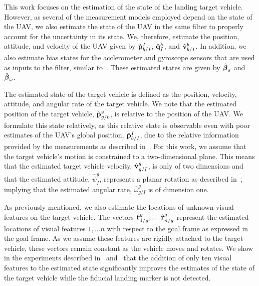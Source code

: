 
This work focuses on the estimation of the state of the landing target vehicle.
However, as several of the measurement models employed depend on the state of the
UAV, we also estimate the state of the UAV in the same filter to properly
account for the uncertainty in its state.
We, therefore, estimate the position, attitude, and velocity of the UAV given by
$\hat{\boldsymbol{\mathrm{p}}}_{b/I}^{I}$, $\hat{\boldsymbol{\mathrm{q}}}_I^{b}$, and
$\hat{\boldsymbol{\mathrm{v}}}_{b/I}^b$.
In addition, we also estimate bias states for the acclerometer and gyroscope sensors that are
used as inputs to the filter, similar to~\cite{li2018common}. These estimated states are given by
$\hat{\boldsymbol{\mathrm{\beta}}}_a$ and $\hat{\boldsymbol{\mathrm{\beta}}}_{\omega}$.


The estimated state of the target vehicle is defined as the position, velocity,
attitude, and angular rate of the target vehicle.
We note that the
estimated position of the target vehicle, $\hat{\boldsymbol{\mathrm{p}}}_{g/b}^v$, is relative to the position of the
UAV.
We formulate this state relatively,
as this relative state is observable even with poor estimates of the UAV's global
position, $\hat{\boldsymbol{\mathrm{p}}}_{b/I}^I$, due to the relative information provided
by the measurements as described in~.
For this work, we assume that the target vehicle's
motion is constrained to a two-dimensional plane. This means that the estimated
target vehicle velocity, $\hat{\boldsymbol{\mathrm{v}}}_{g/I}^{g}$, is only of two dimensions and that the
estimated attitude, $\hat{\psi}_{I}^g$, represents a planar rotation as
described in~, implying that the estimated angular
rate, $\hat{\omega}_{g/I}^g$ is of dimension one.

As previously mentioned, we also estimate the locations of unknown visual
features on the target vehicle.
The vectors $\hat{\boldsymbol{\mathrm{r}}}_{1/g}^{g}, \dots \hat{\boldsymbol{\mathrm{r}}}_{n/g}^{g}$ represent the
estimated locations of visual features $1, \dots n$ with respect to the goal
frame as
expressed in the goal frame. As we assume these features are rigidly attached to the
target vehicle, these vectors remain constant as the vehicle moves and rotates.
We show in the experiments described in~
and~ that the
addition of only ten visual features to the estimated state significantly
improves the estimates of the state of the target vehicle
while the fiducial landing marker is not detected. 

